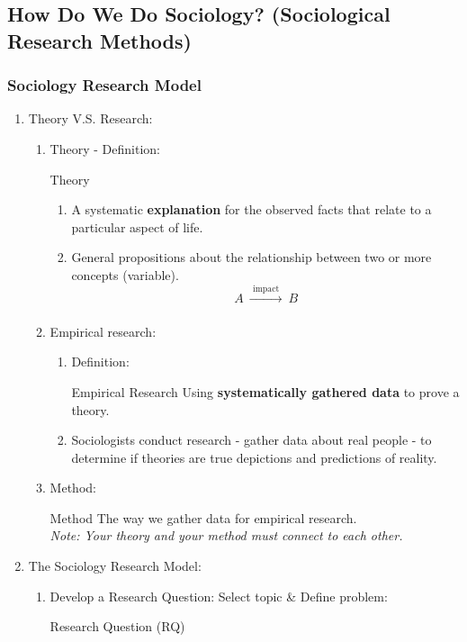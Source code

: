 \documentclass[12pt,a4paper]{article}
\begin{document}
\subsection{How Do We Do Sociology? (Sociological Research Methods)}
\subsubsection{Sociology Research Model}
\begin{enumerate}
	\item Theory V.S. Research: 
	\begin{enumerate}
		\item Theory - Definition: 
		\begin{df}{Theory}
			\begin{enumerate}
				\item A systematic \textbf{explanation} for the observed facts that relate to a particular aspect of life. 
				\item General propositions about the relationship between two or more concepts (variable).
				$$A\  \xrightarrow[]{\text{ impact }}\ B$$
			\end{enumerate}
		\end{df}
		\item Empirical research: 
		\begin{enumerate}
			\item Definition: 
			\begin{df}{Empirical Research}
				Using \textbf{systematically gathered data} to prove a theory.
			\end{df}
			\item Sociologists conduct research - gather data about real people - to determine if theories are true depictions and predictions of reality. 
		\end{enumerate}
		\item Method: 
		\begin{df}{Method}
			The way we gather data for empirical research.\\
			{\color{green}\textit{Note: Your theory and your method must connect to each other. }}
		\end{df}
	\end{enumerate}
	\item The Sociology Research Model: 
	\begin{enumerate}
		\item Develop a Research Question: Select topic \& Define problem: 
		\begin{df}{Research Question (RQ)}

\end{df}
\end{enumerate}
\end{enumerate}
\end{document}
